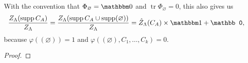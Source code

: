 \documentclass[french]{article}
\DeclareMathOperator{\tr}{tr}
\DeclareMathOperator{\supp}{supp}
\begin{document}
    With the convention that $\Phi_\varnothing=\mathbbm0$ and $\tr \Phi_\varnothing=0$, this also gives us $$
        \frac{Z_\Lambda(\supp C_A)}{Z_\Lambda}=\frac{Z_\Lambda(\supp C_A\cup \supp (\varnothing))}{Z_\Lambda}=\hat Z_\Lambda(C_A)\times\mathbbm 1+ \mathbb 0,
    $$
    because $\varphi((\varnothing))=1$ and $\varphi((\varnothing),C_1,\ldots,C_k)=0$.
    \begin{proof}
        
    \end{proof}
 
 
 
 \printbibliography
\end{document}

